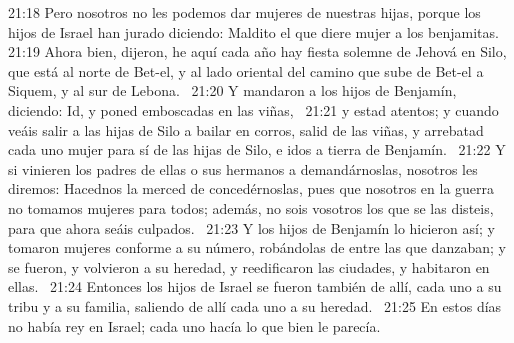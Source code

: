 21:18 Pero nosotros no les podemos dar mujeres de nuestras hijas, porque los hijos de Israel han jurado diciendo: Maldito el que diere mujer a los benjamitas. 
21:19 Ahora bien, dijeron, he aquí cada año hay fiesta solemne de Jehová en Silo, que está al norte de Bet-el, y al lado oriental del camino que sube de Bet-el a Siquem, y al sur de Lebona.  
21:20 Y mandaron a los hijos de Benjamín, diciendo: Id, y poned emboscadas en las viñas,  
21:21 y estad atentos; y cuando veáis salir a las hijas de Silo a bailar en corros, salid de las viñas, y arrebatad cada uno mujer para sí de las hijas de Silo, e idos a tierra de Benjamín.  
21:22 Y si vinieren los padres de ellas o sus hermanos a demandárnoslas, nosotros les diremos: Hacednos la merced de concedérnoslas, pues que nosotros en la guerra no tomamos mujeres para todos; además, no sois vosotros los que se las disteis, para que ahora seáis culpados.  
21:23 Y los hijos de Benjamín lo hicieron así; y tomaron mujeres conforme a su número, robándolas de entre las que danzaban; y se fueron, y volvieron a su heredad, y reedificaron las ciudades, y habitaron en ellas.  
21:24 Entonces los hijos de Israel se fueron también de allí, cada uno a su tribu y a su familia, saliendo de allí cada uno a su heredad.  
21:25 En estos días no había rey en Israel; cada uno hacía lo que bien le parecía.
